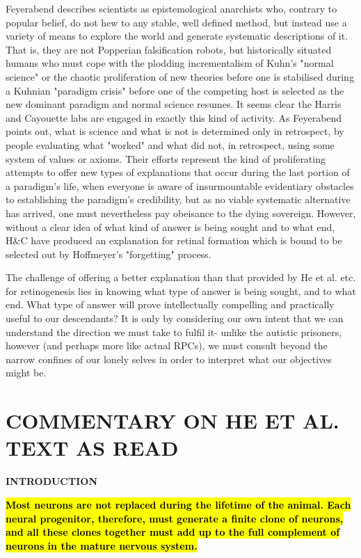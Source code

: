 \documentclass{ut-thesis}
\begin{document}
Feyerabend describes scientists as epistemological anarchists who, contrary to popular belief, do not hew to any stable, well defined method, but instead use a variety of means to explore the world and generate systematic descriptions of it. That is, they are not Popperian falsification robots, but historically situated humans who must cope with the plodding incrementalism of Kuhn's "normal science" or the chaotic proliferation of new theories before one is stabilised during a Kuhnian "paradigm crisis" before one of the competing host is selected as the new dominant paradigm and normal science resumes. It seems clear the Harris and Cayouette labs are engaged in exactly this kind of activity. As Feyerabend points out, what is science and what is not is determined only in retrospect, by people evaluating what "worked" and what did not, in retrospect, using some system of values or axioms. Their efforts represent the kind of proliferating attempts to offer new types of explanations that occur during the last portion of a paradigm's life, when everyone is aware of insurmountable evidentiary obstacles to establishing the paradigm's credibility, but as no viable systematic alternative has arrived, one must nevertheless pay obeisance to the dying sovereign. However, without a clear idea of what kind of answer is being sought and to what end, H&C have produced an explanation for retinal formation which is bound to be selected out by Hoffmeyer's "forgetting" process.

The challenge of offering a better explanation than that provided by He et al. etc. for retinogenesis lies in knowing what type of answer is being sought, and to what end. What type of answer will prove intellectually compelling and practically useful to our descendants? It is only by considering our own intent that we can understand the direction we must take to fulfil it- unlike the autistic prisoners, however (and perhaps more like actual RPCs), we must consult beyond the narrow confines of our lonely selves in order to interpret what our objectives might be.


\bigskip

\section{COMMENTARY ON HE ET AL. TEXT AS READ}

\bigskip

\textbf{INTRODUCTION}

\bigskip

\textbf{
\hl{Most neurons are not replaced during the lifetime of the animal.
Each neural progenitor, therefore, must generate a finite clone of
neurons, and all these clones together must add up to the full
complement of neurons in the mature nervous system.}
}
\end{document}
